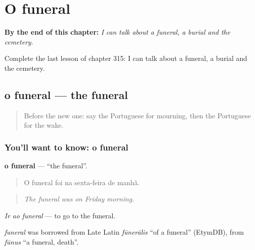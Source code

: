 
\chapter{O funeral}
\label{ch:pt-o-funeral}

\begin{chapteropening}
\textbf{By the end of this chapter:} \emph{I can talk about a funeral, a burial and the cemetery.}

Complete the last lesson of chapter 315: I can talk about a funeral, a burial and the cemetery.
\end{chapteropening}

\section[o funeral]{o funeral — the funeral}

\label{lesson:PT-C315-funeral}



\begin{quote}
Before the new one: say the Portuguese for mourning, then the Portuguese for the wake.
\end{quote}

\subsection*{You'll want to know: o funeral}
\textbf{o funeral} — \textquotedblleft{}the funeral\textquotedblright{}.

\begin{quote}
O funeral foi na sexta-feira de manhã.
\end{quote}

\begin{quote}
\emph{The funeral was on Friday morning.}
\end{quote}

\emph{Ir ao funeral} — to go to the funeral.

\begin{cousinweb}
\emph{funeral} was borrowed from Late Latin \emph{fūnerālis} \textquotedblleft{}of a funeral\textquotedblright{} (EtymDB), from \emph{fūnus} \textquotedblleft{}a funeral, death\textquotedblright{}.
\end{cousinweb}

